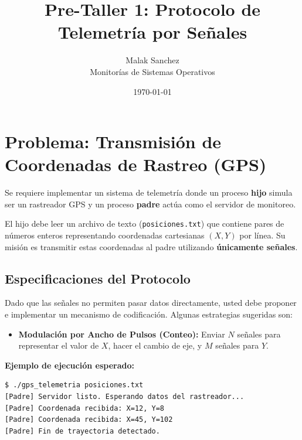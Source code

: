 \documentclass[12pt,a4paper]{article}
\title{\textbf{Pre-Taller 1: Protocolo de Telemetría por Señales}}
\author{Malak Sanchez \\ \small Monitorías de Sistemas Operativos}
\date{\today}
\begin{document}
\maketitle

\section*{Problema: Transmisión de Coordenadas de Rastreo (GPS)}
Se requiere implementar un sistema de telemetría donde un proceso \textbf{hijo} simula ser un rastreador GPS y un proceso \textbf{padre} actúa como el servidor de monitoreo.

El hijo debe leer un archivo de texto (\texttt{posiciones.txt}) que contiene pares de números enteros representando coordenadas cartesianas $(X, Y)$ por línea. Su misión es transmitir estas coordenadas al padre utilizando \textbf{únicamente señales}.

\subsection*{Especificaciones del Protocolo}
Dado que las señales no permiten pasar datos directamente, usted debe proponer e implementar un mecanismo de codificación. Algunas estrategias sugeridas son:
\begin{itemize}
    \item \textbf{Modulación por Ancho de Pulsos (Conteo):} Enviar $N$ señales para representar el valor de $X$, hacer el cambio de eje, y $M$ señales para $Y$.
\end{itemize}

\begin{center}
\end{center}

\textbf{Ejemplo de ejecución esperado:} 
\begin{lstlisting}[numbers=none]
$ ./gps_telemetria posiciones.txt
[Padre] Servidor listo. Esperando datos del rastreador...
[Padre] Coordenada recibida: X=12, Y=8
[Padre] Coordenada recibida: X=45, Y=102
[Padre] Fin de trayectoria detectado.
\end{lstlisting}
\end{document}
